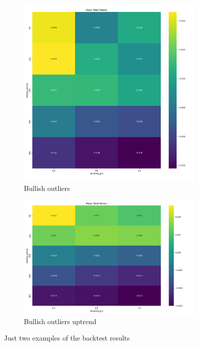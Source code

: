 \documentclass[12pt]{article}
\begin{document}
\begin{figure}[H]
    \centering
    \begin{subfigure}[b]{0.48\textwidth}
        \includegraphics[width=\textwidth,height=0.3\textheight,keepaspectratio]{imgs/example_backtest_for_thesis.png}
        \caption{Bullish outliers}
        \label{fig:bullish_outliers}
    \end{subfigure}
    \hfill
    \begin{subfigure}[b]{0.48\textwidth}
        \includegraphics[width=\textwidth,height=0.3\textheight,keepaspectratio]{imgs/example_for_thesis_v2.png}
        \caption{Bullish outliers uptrend}
        \label{fig:bullish_outliers_uptrend}
    \end{subfigure}
    \caption{Just two examples of the backtest results}
    \label{fig:bullish_outliers_comparison}
\end{figure}
\end{document}
